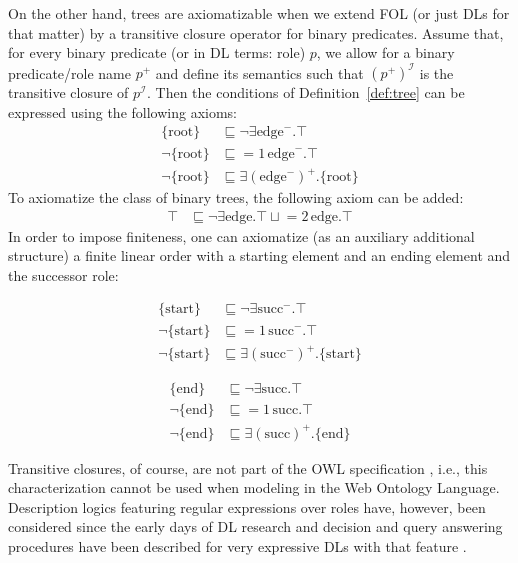 On the other hand, trees are axiomatizable when we extend FOL (or just DLs for that matter) by a transitive closure operator for binary predicates. Assume that, for every binary predicate (or in DL terms: role) $p$, we allow for a binary predicate/role name $p^+$ and define its semantics such that $(p^+)^\mathcal{I}$ is the transitive closure of $p^\mathcal{I}$. Then the conditions of Definition~\ref{def:tree} can be expressed using the following axioms:
%
\begin{align}
\{\text{root}\} &\sqsubseteq  \neg \exists \text{edge}^-.\top\\
\neg \{\text{root}\} &\sqsubseteq  {=}1\, \text{edge}^-.\top \\
\neg \{\text{root}\} &\sqsubseteq \exists (\text{edge}^-)^+.\{\text{root}\}
\end{align}
%
To axiomatize the class of binary trees, the following axiom can be added: 
%
\begin{align}
\top &\sqsubseteq  \neg \exists \text{edge}.\top \sqcup {{=}2} \,\text{edge}.\top
\end{align}
%
In order to impose finiteness, one can axiomatize (as an auxiliary additional structure) a finite linear order with a starting element and an ending element and the successor role:

\noindent
\begin{minipage}{0.49\textwidth}
\begin{align}
\{\text{start}\} &\sqsubseteq  \neg \exists \text{succ}^-.\top\\
\neg \{\text{start}\} &\sqsubseteq  {=}1\, \text{succ}^-.\top \\
\neg \{\text{start}\} &\sqsubseteq \exists (\text{succ}^-)^+.\{\text{start}\}
\end{align}
\end{minipage}
\hfill
\begin{minipage}{0.49\textwidth}
\begin{align}
\{\text{end}\} &\sqsubseteq  \neg \exists \text{succ}.\top\\
\neg \{\text{end}\} &\sqsubseteq  {=}1\, \text{succ}.\top \\
\neg \{\text{end}\} &\sqsubseteq \exists (\text{succ})^+.\{\text{end}\}
\end{align}
\end{minipage}

\bigskip

Transitive closures, of course, are not part of the OWL specification \cite{owl2-primer}, i.e., this characterization cannot be used when modeling in the Web Ontology Language. Description logics featuring regular expressions over roles have, however, been considered since the early days of DL research \cite{DBLP:conf/ijcai/Baader91} and decision and query answering procedures have been described for very expressive DLs with that feature \cite{DBLP:conf/ijcai/CalvaneseEO09}.

